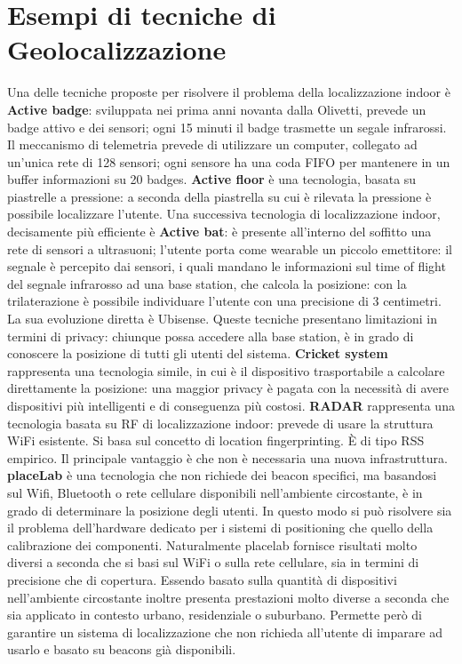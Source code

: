 \section{Esempi di tecniche di Geolocalizzazione}
Una delle tecniche proposte per risolvere il problema della localizzazione
indoor è \textbf{Active badge}: sviluppata nei prima anni novanta dalla
Olivetti, prevede un badge attivo e dei sensori; ogni 15 minuti il badge
trasmette un segale infrarossi. Il meccanismo di telemetria prevede di utilizzare
un computer, collegato ad un'unica rete di 128 sensori; ogni sensore ha una coda
FIFO per mantenere in un buffer informazioni su 20 badges.
\bigbreak
\textbf{Active floor} è una tecnologia, basata su piastrelle a pressione: a
seconda della piastrella su cui è rilevata la pressione è possibile localizzare
l'utente.
\bigbreak
Una successiva tecnologia di localizzazione indoor, decisamente più efficiente è
\textbf{Active bat}: è presente all'interno del soffitto una rete di sensori a
ultrasuoni; l'utente porta come wearable un piccolo emettitore: il segnale è
percepito dai sensori, i quali mandano le informazioni sul time of flight del
segnale infrarosso ad una base station, che calcola la posizione: con la
trilaterazione è possibile individuare l'utente con una precisione di 3
centimetri.
La sua evoluzione diretta è Ubisense.
\bigbreak
Queste tecniche presentano limitazioni in termini di privacy: chiunque possa
accedere alla base station, è in grado di conoscere la posizione di tutti gli
utenti del sistema. \textbf{Cricket system} rappresenta una tecnologia simile,
in cui è il dispositivo trasportabile a calcolare direttamente la posizione: una
maggior privacy è pagata con la necessità di avere dispositivi più intelligenti
e di conseguenza più costosi.
\bigbreak
\textbf{RADAR} rappresenta una tecnologia basata su RF di localizzazione indoor:
prevede di usare la struttura WiFi esistente. Si basa sul concetto di location
fingerprinting. È di tipo RSS empirico. Il principale vantaggio è che non è
necessaria una nuova infrastruttura.
\bigbreak
\textbf{placeLab} è una tecnologia che non richiede dei beacon specifici, ma
basandosi sul Wifi, Bluetooth o rete cellulare disponibili nell'ambiente
circostante, è in grado di determinare la posizione degli utenti. In questo modo
si può risolvere sia il problema dell'hardware dedicato per i sistemi di
positioning che quello della calibrazione dei componenti.
Naturalmente placelab fornisce risultati molto diversi a seconda che si basi sul
WiFi o sulla rete cellulare, sia in termini di precisione che di copertura.
Essendo basato sulla quantità di dispositivi nell'ambiente circostante inoltre
presenta prestazioni molto diverse a seconda che sia applicato in contesto
urbano, residenziale o suburbano.
Permette però di garantire un sistema di localizzazione che non richieda
all'utente di imparare ad usarlo e basato su beacons già disponibili.

